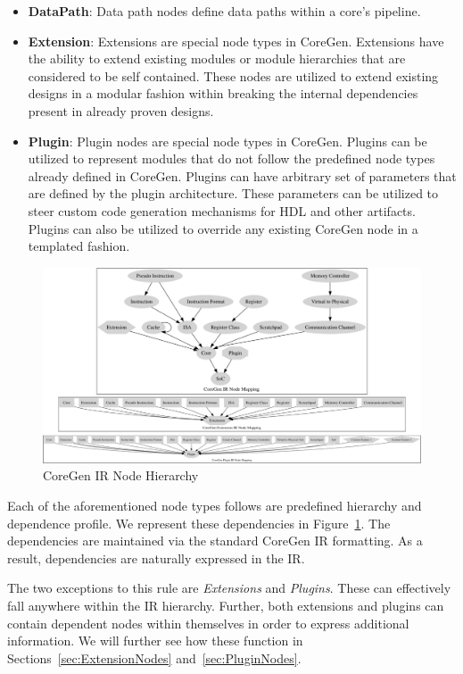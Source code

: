 \documentclass{article}
\begin{document}
\begin{itemize}
\item \textbf{DataPath}: Data path nodes define data paths within a core's pipeline.
\item \textbf{Extension}: Extensions are special node types in CoreGen.  Extensions have the ability to extend existing modules or module hierarchies that are considered to be self contained.  These nodes are utilized to extend existing designs in a modular fashion within breaking the internal dependencies present in already proven designs.
\item \textbf{Plugin}: Plugin nodes are special node types in CoreGen.  Plugins can be utilized to represent modules that do not follow the predefined node types already defined in CoreGen.  Plugins can have arbitrary set of parameters that are defined by the plugin architecture.  These parameters can be utilized to steer custom code generation mechanisms for HDL and other artifacts.  Plugins can also be utilized to override any existing CoreGen node in a templated fashion.  
\end{itemize}

\begin{figure}[h]
\begin{center}
\includegraphics[width=\textwidth]{figures/NodeMapping.pdf}
\vspace*{8pt}
\caption{CoreGen IR Node Hierarchy}
\label{fig:IRNodes}
\end{center}
\end{figure}

Each of the aforementioned node types follows are predefined hierarchy and dependence profile.  We represent 
these dependencies in Figure~\ref{fig:IRNodes}.  The dependencies are maintained via the standard CoreGen IR 
formatting.  As a result, dependencies are naturally expressed in the IR.

The two exceptions to this rule are \textit{Extensions} and \textit{Plugins}.  These can effectively fall anywhere within the 
IR hierarchy.  Further, both extensions and plugins can contain dependent nodes within themselves in order to express 
additional information.  We will further see how these function in Sections~\ref{sec:ExtensionNodes} and~\ref{sec:PluginNodes}.  
\end{document}
